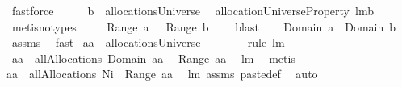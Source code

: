 \begin{isabellebody}
\ fastforce\ \isamarkupfalse%
\ \isamarkupfalse%
\ \isanewline
{}{\isacharcolon}\ {\isachardoublequoteopen}{\isacharquery}b\ {\isasymin}\ allocationsUniverse{\isachardoublequoteclose}\ \isamarkupfalse%
\ allocationUniverseProperty\ lm{}{}b\ \isamarkupfalse%
\ {\isacharparenleft}metis{\isacharparenleft}no{\isacharunderscore}types{\isacharparenright}{\isacharparenright}\ \isamarkupfalse%
\ \isanewline
{}{\isacharcolon}\ {\isachardoublequoteopen}{\isasymUnion}\ Range\ a\ {\isasyminter}\ {\isasymUnion}\ {\isacharparenleft}Range\ {\isacharquery}b{\isacharparenright}\ {\isacharequal}\ {\isacharbraceleft}{\isacharbraceright}{\isachardoublequoteclose}\ \isamarkupfalse%
\ blast\ \isamarkupfalse%
\ \isanewline
{}{\isacharcolon}\ {\isachardoublequoteopen}Domain\ a\ {\isasyminter}\ Domain\ {\isacharquery}b\ {\isacharequal}{\isacharbraceleft}{\isacharbraceright}{\isachardoublequoteclose}\ \isamarkupfalse%
\ assms\ \isamarkupfalse%
\ fast\isanewline
{}\isamarkupfalse%
\ {\isachardoublequoteopen}{\isacharquery}aa\ {\isasymin}\ allocationsUniverse{\isachardoublequoteclose}\ \isamarkupfalse%
\ {}\ {}\ {}\ {}\ \isamarkupfalse%
\ {\isacharparenleft}rule\ lm{}{}{\isacharparenright}\isanewline
{}\isamarkupfalse%
\ \isamarkupfalse%
\ {\isachardoublequoteopen}{\isacharquery}aa\ {\isasymin}\ allAllocations{\isacharprime}{\isacharprime}\ {\isacharparenleft}Domain\ {\isacharquery}aa{\isacharparenright}\ \isanewline
{\isacharparenleft}{\isasymUnion}\ Range\ {\isacharquery}aa{\isacharparenright}{\isachardoublequoteclose}\ \isamarkupfalse%
\ lm{}{}\ \isamarkupfalse%
\ metis\ \isamarkupfalse%
\ \isamarkupfalse%
\ \isanewline
{\isachardoublequoteopen}{\isacharquery}aa\ {\isasymin}\ allAllocations{\isacharprime}{\isacharprime}\ {\isacharparenleft}N{\isasymunion}{\isacharbraceleft}{\isacharquery}i{\isacharbraceright}{\isacharparenright}\ {\isacharparenleft}{\isasymUnion}\ Range\ {\isacharquery}aa{\isacharparenright}{\isachardoublequoteclose}\ \isamarkupfalse%
\ lm{}{}\ assms\ paste{\isacharunderscore}def\ \isamarkupfalse%
\ auto\isanewline
{}\isamarkupfalse%
\ \isamarkupfalse%

\end{isabellebody}
